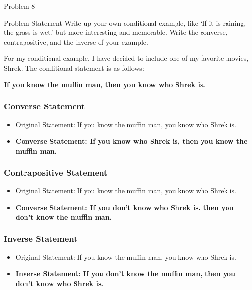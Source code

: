 \begin{problem}{Problem 8}
    \begin{statement}{Problem Statement}
        Write up your own conditional example, like `If it is raining, the grass is wet.' but more interesting and memorable. Write the converse, contrapositive, and the inverse of your example.
    \end{statement}

    \begin{highlight}[Solution]
        For my conditional example, I have decided to include one of my favorite movies, Shrek. The conditional statement is as follows:

        \begin{center}
            \textbf{If you know the muffin man, then you know who Shrek is.}
        \end{center}

        \subsubsection*{Converse Statement}

        \begin{itemize}
            \item Original Statement: If you know the muffin man, you know who Shrek is.
            \item \textbf{Converse Statement: If you know who Shrek is, then you know the muffin man.}
        \end{itemize}

        \subsubsection*{Contrapositive Statement}

        \begin{itemize}
            \item Original Statement: If you know the muffin man, you know who Shrek is.
            \item \textbf{Converse Statement: If you don't know who Shrek is, then you don't know the muffin man.}
        \end{itemize}

        \subsubsection*{Inverse Statement}

        \begin{itemize}
            \item Original Statement: If you know the muffin man, you know who Shrek is.
            \item \textbf{Inverse Statement: If you don't know the muffin man, then you don't know who Shrek is.}
        \end{itemize}
    \end{highlight}
\end{problem}

